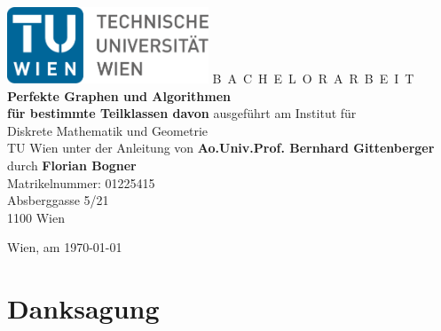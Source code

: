 \documentclass[a4paper,11pt,bibliography=totoc,listof=totoc,headinclude=true,cleardoublepage=empty,oneside]{NumPDEsThesis}
\begin{document}


\begin{titlepage}
  \begin{center}
    \includegraphics[width=0.45\textwidth]{figures/TULogo.pdf}
    \vskip 1cm%
    {\LARGE B~\Large A~C~H~E~L~O~R~A~R~B~E~I~T}
    \vskip 8mm
    {\huge\bfseries Perfekte Graphen und Algorithmen \\[1ex] für bestimmte Teilklassen davon}
    \vskip 1cm
    \large 
    ausgef\"uhrt am    
    \vskip 0.75cm
    {\Large Institut f\"ur\\[1ex] Diskrete Mathematik und Geometrie}\\[1ex]
    {\Large TU Wien}
    \vskip0.75cm
    unter der Anleitung von
    \vskip0.75cm
    {\Large\bfseries Ao.Univ.Prof. Bernhard Gittenberger}\\[1ex]
    \vskip 0.5cm
    durch
    \vskip 0.5cm
    {\Large\bfseries Florian Bogner}\\[1ex]
    Matrikelnummer: {01225415}\\[1ex]
    {Absberggasse 5/21}\\[1ex]
    {1100 Wien}
  \end{center}
  
  \vfill
  
  \small
  Wien, am {\today} %
  \vspace*{-15mm}
\end{titlepage}

\cleardoublepage


\chapter*{Danksagung} %
\thispagestyle{empty}
\end{document}
